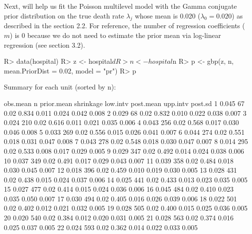 \documentclass[article]{jss}
\begin{document}
Next,  will help us fit the Poisson multilevel model with the Gamma conjugate prior distribution on the true death rate $\lambda_{j}$ whose mean is 0.020 ($\lambda_{0}=0.020$) as described in the section 2.2. For reference, the number of regression coefficients ($m$) is 0 because we do not need to estimate the prior mean via log-linear regression (see section 3.2).
\begin{CodeChunk}
\begin{CodeInput}
R> data(hospital)
R> z <- hospital$d
R> n <- hospital$n
R> p <- gbp(z, n, mean.PriorDist = 0.02, model = "pr")
R> p
\end{CodeInput}
\begin{CodeOutput}
Summary for each unit (sorted by n):

         obs.mean    n prior.mean shrinkage low.intv post.mean upp.intv post.sd
1           0.045   67       0.02     0.834    0.011     0.024    0.042   0.008
2           0.029   68       0.02     0.832    0.010     0.022    0.038   0.007
3           0.024  210       0.02     0.616    0.011     0.021    0.035   0.006
4           0.043  256       0.02     0.568    0.017     0.030    0.046   0.008
5           0.033  269       0.02     0.556    0.015     0.026    0.041   0.007
6           0.044  274       0.02     0.551    0.018     0.031    0.047   0.008
7           0.043  278       0.02     0.548    0.018     0.030    0.047   0.007
8           0.014  295       0.02     0.533    0.008     0.017    0.029   0.005
9           0.029  347       0.02     0.492    0.014     0.024    0.038   0.006
10          0.037  349       0.02     0.491    0.017     0.029    0.043   0.007
11          0.039  358       0.02     0.484    0.018     0.030    0.045   0.007
12          0.018  396       0.02     0.459    0.010     0.019    0.030   0.005
13          0.028  431       0.02     0.438    0.015     0.024    0.037   0.006
14          0.025  441       0.02     0.433    0.013     0.023    0.035   0.005
15          0.027  477       0.02     0.414    0.015     0.024    0.036   0.006
16          0.045  484       0.02     0.410    0.023     0.035    0.050   0.007
17          0.030  494       0.02     0.405    0.016     0.026    0.039   0.006
18          0.022  501       0.02     0.402    0.012     0.021    0.032   0.005
19          0.028  505       0.02     0.400    0.015     0.025    0.036   0.005
20          0.020  540       0.02     0.384    0.012     0.020    0.031   0.005
21          0.028  563       0.02     0.374    0.016     0.025    0.037   0.005
22          0.024  593       0.02     0.362    0.014     0.022    0.033   0.005

\end{CodeOutput}
\end{CodeChunk}
\end{document}

